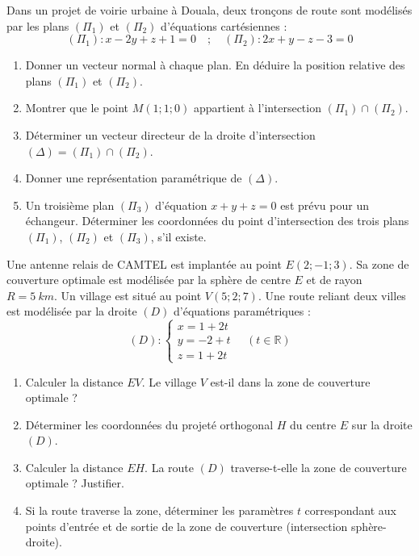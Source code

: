 \documentclass[11pt]{article}
\begin{document}
\begin{exercice}
Dans un projet de voirie urbaine à Douala, deux tronçons de route sont modélisés par les plans $(\Pi_1)$ et $(\Pi_2)$ d'équations cartésiennes :
\[
(\Pi_1) : x - 2y + z + 1 = 0 \quad ; \quad (\Pi_2) : 2x + y - z - 3 = 0
\]
\begin{enumerate}
    \item Donner un vecteur normal à chaque plan. En déduire la position relative des plans $(\Pi_1)$ et $(\Pi_2)$.
    \item Montrer que le point $M(1; 1; 0)$ appartient à l'intersection $(\Pi_1) \cap (\Pi_2)$.
    \item Déterminer un vecteur directeur de la droite d'intersection $(\Delta) = (\Pi_1) \cap (\Pi_2)$.
    \item Donner une représentation paramétrique de $(\Delta)$.
    \item Un troisième plan $(\Pi_3)$ d'équation $x + y + z = 0$ est prévu pour un échangeur. Déterminer les coordonnées du point d'intersection des trois plans $(\Pi_1)$, $(\Pi_2)$ et $(\Pi_3)$, s'il existe.
\end{enumerate}
\end{exercice}

\begin{exercice}
Une antenne relais de CAMTEL est implantée au point $E(2; -1; 3)$. Sa zone de couverture optimale est modélisée par la sphère de centre $E$ et de rayon $R = \SI{5}{km}$. Un village est situé au point $V(5; 2; 7)$. Une route reliant deux villes est modélisée par la droite $(D)$ d'équations paramétriques :
\[
(D) : \begin{cases} x = 1 + 2t \\ y = -2 + t \\ z = 1 + 2t \end{cases} \quad (t \in \mathbb{R})
\]
\begin{enumerate}
    \item Calculer la distance $EV$. Le village $V$ est-il dans la zone de couverture optimale ?
    \item Déterminer les coordonnées du projeté orthogonal $H$ du centre $E$ sur la droite $(D)$.
    \item Calculer la distance $EH$. La route $(D)$ traverse-t-elle la zone de couverture optimale ? Justifier.
    \item Si la route traverse la zone, déterminer les paramètres $t$ correspondant aux points d'entrée et de sortie de la zone de couverture (intersection sphère-droite).
\end{enumerate}
\end{exercice}
\end{document}
